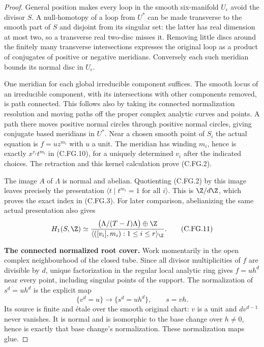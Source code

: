 \begin{proof}
General position makes every loop in the smooth six-manifold
$U_\epsilon$ avoid the divisor $S$. A null-homotopy of a loop from
$U^*$ can be made transverse to the smooth part of $S$ and disjoint
from its singular set: the latter has real dimension at most two,
so a transverse real two-disc misses it. Removing little discs
around the finitely many transverse intersections expresses the
original loop as a product of conjugates of positive or negative
meridians. Conversely each such meridian bounds its normal disc
in $U_\epsilon$.

One meridian for each global irreducible component suffices. The
smooth locus of an irreducible component, with its intersections
with other components removed, is path connected. This follows
also by taking its connected normalization resolution and moving
paths off the proper complex analytic curves and points. A path
there moves positive normal circles through positive normal circles,
giving conjugate based meridians in $U^*$. Near a chosen smooth
point of $S_i$ the actual equation is $f=u z^{m_i}$ with $u$ a
unit. The meridian has winding $m_i$, hence is exactly
$x^{v_i}t^{m_i}$ in (C.FG.10), for a uniquely determined $v_i$
after the indicated choices. The retraction and this kernel
calculation prove (C.FG.2).

The image $A$ of $\Lambda$ is normal and abelian. Quotienting
(C.FG.2) by this image leaves precisely the presentation
$\langle t\mid t^{m_i}=1\text{ for all }i\rangle$.
This is $\Z/d\Z$, which proves the exact index in (C.FG.3).
For later comparison, abelianizing the same actual presentation
also gives
\[
 H_1(S,\Z)\simeq
 \frac{\bigl(\Lambda/(T-I)\Lambda\bigr)\oplus\Z}
      {\langle ([v_i],m_i):1\le i\le r\rangle_{\Z}}.
                                                        \tag{C.FG.11}
\]

\par\medskip\noindent\textbf{The connected normalized root cover.}
Work momentarily in the open complex neighbourhood of the closed
tube. Since all divisor multiplicities of $f$ are divisible by
$d$, unique factorization in the regular local analytic ring
gives $f=u h^d$ near every point, including singular points of the
support. The normalization of $s^d=u h^d$ is the explicit map
\[
       \{v^d=u\}\longrightarrow\{s^d=u h^d\},
                         \qquad s=vh .                \tag{C.FG.12}
\]
Its source is finite and \'etale over the smooth original chart:
$v$ is a unit and $d v^{d-1}$ never vanishes. It is normal and is
isomorphic to the base change over $h\ne0$, hence is exactly that
base change's normalization. These normalization maps glue.


\end{proof}
